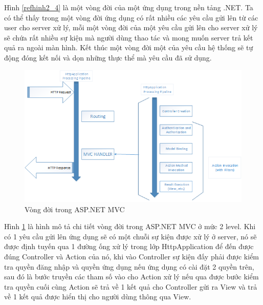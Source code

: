 \par
Hình \ref{refhinh2_4} là một vòng đời của một ứng dụng trong nền tảng .NET. Ta có thể thấy trong một vòng đời ứng dụng có rất nhiều các yêu cầu gửi lên từ các user cho server xử lý, mỗi một vòng đời của một yêu cầu gửi lên cho server xử lý sẽ chứa rất nhiều sự kiện mà người dùng thao tác và mong muốn server trả kết quả ra ngoài màn hình. Kết thúc một vòng đời một của yêu cầu hệ thống sẽ tự động đóng kết nối và dọn những thực thể mà yêu cầu đã sử dụng.
\begin{center}
    \begin{figure}[h]
    \begin{center}
     \includegraphics[scale=1.0]{image/vongdoiMVCchitiet.png}
    \end{center}
    \caption{Vòng đời trong ASP.NET MVC}
    \label{refhinh2_5}
    \end{figure}
\end{center}
\par
Hình \ref{refhinh2_5} là hình mô tả chi tiết vòng đời trong ASP.NET MVC ở mức 2 level. Khi có 1 yêu cầu gửi lên ứng dụng sẽ có một chuỗi sự kiện được xử lý ở server, nó sẽ được định tuyến qua 1 đường ống xử lý trong lớp HttpApplication để đến được đúng Controller và Action của nó, khi vào Controller sự kiện đấy phải được kiểm tra quyền đăng nhập và quyền ứng dụng nếu ứng dụng có cài đặt 2 quyền trên, sau đó là bước truyền các tham số vào cho Action xử lý nếu qua được bước kiểm tra quyền cuối cùng Action sẽ trả về 1 kết quả cho Controller gửi ra View và trả về 1 kết quả được hiển thị cho người dùng thông qua View.
